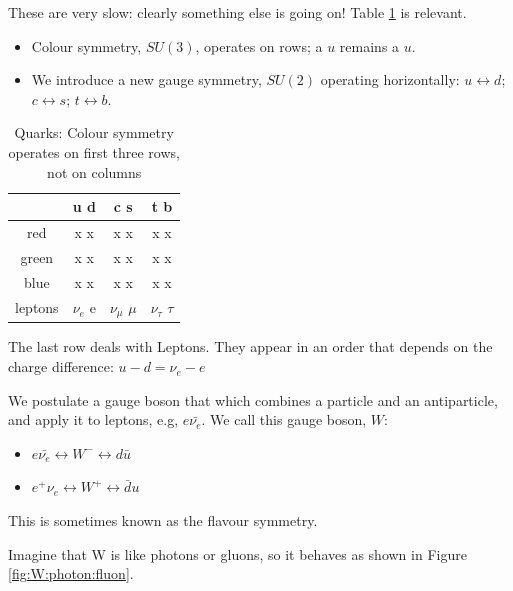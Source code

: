 \documentclass[]{article}
\begin{document}
These are very slow: clearly something else is going on! Table \ref{tab:QCD:rows} is relevant. \begin{itemize}
	\item Colour symmetry, $SU(3)$, operates on rows; a $u$ remains a $u.$
	\item We introduce a new gauge symmetry, $SU(2)$ operating horizontally: $u\leftrightarrow d$;  $c\leftrightarrow s$;  $t\leftrightarrow b$.
\end{itemize}

\begin{table}[H]
	\begin{center}
		\caption{Quarks: Colour symmetry operates on first three rows, not on columns}\label{tab:QCD:rows}
		\begin{tabular}{|c|c|c|c|} \hline
			&u d&c s&t b \\ \hline
			red&x x&x x&x x\\ \hline
			green&x x&x x&x x\\ \hline
			blue&x x&x x&x x\\ \hline
			leptons&$\nu_e$ e&$\nu_\mu$ $\mu$&$\nu_\tau$ $\tau$\\ \hline
		\end{tabular}
	\end{center}
\end{table}

The last row deals with Leptons. They appear in an order that depends on the charge difference: $u-d=\nu_e-e$
 
We postulate a gauge boson that which combines a particle and an antiparticle, and apply it to leptons, e.g, $e \bar{\nu_e}$. We call this gauge boson, $W$:

 \begin{itemize}
 	\item $e \bar{\nu_e}\leftrightarrow W^- \leftrightarrow d\bar{u}$
 	\item $e^+ \nu_e\leftrightarrow W^+ \leftrightarrow \bar{d}u$
 \end{itemize}

This is sometimes known as the flavour symmetry.

Imagine that W is like photons or gluons, so it behaves as shown in Figure \ref{fig:W:photon:fluon}.
\end{document}
